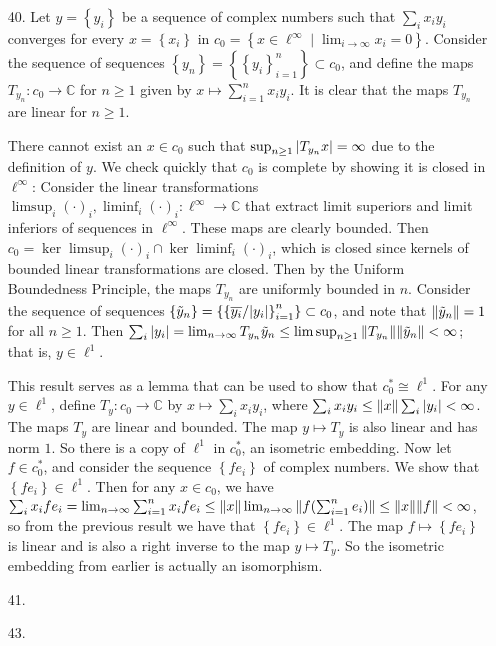 \documentclass[11pt,leqno]{article}
\theoremstyle{plain}
\theoremstyle{definition}
\numberwithin{equation}{section}
\numberwithin{lem}{section}
\newcommand{\cbr}[1]{\left\{#1\right\}}
\begin{document}
\begin{enumerate}
  \item[40.] Let $y = \cbr{y_i}$ be a sequence of complex numbers such that $\sum_ix_iy_i$ converges for every $x = \cbr{x_i}$ in $c_0 = \cbr{x\in \ell^\infty\mid \lim_{i\to\infty}x_i = 0}$. Consider the sequence of sequences $\cbr{y_n} = \cbr{\cbr{y_i}_{i=1}^n}\subset c_0$, and define the maps $T_{y_n}\colon c_0\to\mathbb C$ for $n\geq 1$ given by $x\mapsto \sum_{i=1}^nx_iy_i$. It is clear that the maps $T_{y_n}$ are linear for $n\geq 1$.
  
  There cannot exist an $x\in c_0$ such that $\sup_{n\geq 1}\abs{T_{y_n}x} = \infty$ due to the definition of $y$. We check quickly that $c_0$ is complete by showing it is closed in $\ell^\infty$: Consider the linear transformations $\limsup_i(\cdot)_i,\liminf_i(\cdot)_i\colon \ell^\infty\to\mathbb C$ that extract limit superiors and limit inferiors of sequences in $\ell^\infty$. These maps are clearly bounded. Then $c_0 = \ker\limsup_i(\cdot)_i\cap\ker \liminf_i(\cdot)_i$, which is closed since kernels of bounded linear transformations are closed. Then by the Uniform Boundedness Principle, the maps $T_{y_n}$ are uniformly bounded in $n$. Consider the sequence of sequences  $\cbr{\tilde y_n} = \cbr{\cbr{\overline{y_i}/\abs{y_i}}_{i=1}^n}\subset c_0$, and note that $\norm{\tilde y_n} = 1$ for all $n\geq 1$. Then $\sum_i \abs{y_i} = \lim_{n\to\infty}T_{y_n}\tilde y_n\leq \limsup_{n\geq 1}\norm{T_{y_n}}\norm{\tilde y_n} < \infty$; that is, $y\in \ell^1$.

  This result serves as a lemma that can be used to show that $c_0^\ast \cong \ell^1$. For any $y\in \ell^1$, define $T_y\colon c_0\to\mathbb C$ by $x\mapsto \sum_i x_iy_i$, where $\sum_i x_iy_i\leq \norm{x}\sum_i\abs{y_i}<\infty$. The maps $T_y$ are linear and bounded. The map $y\mapsto T_y$ is also linear and has norm $1$. So there is a copy of $\ell^1$ in $c_0^\ast$, an isometric embedding. Now let $f\in c_0^\ast$, and consider the sequence $\cbr{fe_i}$ of complex numbers. We show that $\cbr{fe_i}\in\ell^1$. Then for any $x\in c_0$, we have $\sum_ix_ife_i = \lim_{n\to\infty}\sum_{i=1}^nx_ife_i\leq \norm{x}\lim_{n\to\infty}\norm{f(\sum_{i=1}^ne_i)}\leq \norm{x}\norm{f} < \infty$, so from the previous result we have that $\cbr{fe_i}\in \ell^1$. The map $f\mapsto \cbr{fe_i}$ is linear and is also a right inverse to the map $y\mapsto T_y$. So the isometric embedding from earlier is actually an isomorphism.
  
  \item[41.] 
  
  \item[43.] 
  
\end{enumerate}
\end{document}
